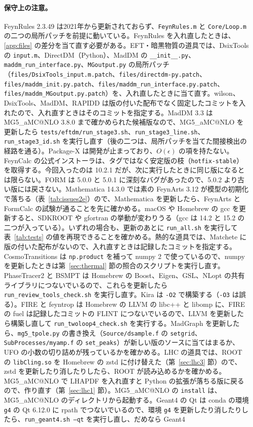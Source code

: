 \documentclass[a4paper,10pt]{ltjsarticle}
\makeatletter
\newcommand{\MGaMC}{MG5\_aMC@NLO}
\makeatother
\begin{document}
\paragraph{保守上の注意。}FeynRules 2.3.49 は2021年から更新されておらず、\texttt{FeynRules.m} と \texttt{Core/Loop.m} の二つの局所パッチを前提に動いている。FeynRules を入れ直したときは、\ref{app:files} の差分を当て直す必要がある。EFT・暗黒物質の道具では、DsixTools の \texttt{input.m}、DirectDM（Python）、MadDM の \texttt{\_\_init\_\_.py}、\texttt{maddm\_run\_interface.py}、\texttt{MGoutput.py} の局所パッチ（\nolinkurl{files/DsixTools_input.m.patch}、\nolinkurl{files/directdm-py.patch}、\nolinkurl{files/maddm_init.py.patch}、\nolinkurl{files/maddm_run_interface.py.patch}、\nolinkurl{files/maddm_MGoutput.py.patch}）を、入れ直したときに当て直す。wilson、DsixTools、MadDM、RAPIDD は版の付いた配布でなく固定したコミットを入れたので、入れ直すときはそのコミットを指定する。MadDM 3.3 は \MGaMC{} 3.8.0 まで確かめられた候補版なので、\MGaMC{} を更新したら \nolinkurl{tests/eftdm/run_stage3.sh}、\texttt{run\_stage3\_line.sh}、\texttt{run\_stage3\_id.sh} を実行し直す（後の二つは、局所パッチを当てた間接検出の経路を通る）。Package-X は開発が止まっており、$O(\epsilon)$ の項を持たない。FeynCalc の公式インストーラは、タグではなく安定版の枝（\texttt{hotfix-stable}）を取得する。今回入ったのは 10.2.1 だが、次に実行したときに同じ版になるとは限らない。FORM は 5.0.0 と 5.0.1 に深刻なバグがあったので、5.0.2 より古い版には戻さない。Mathematica 14.3.0 では素の FeynArts 3.12 が模型の初期化で落ちる（表~\ref{tab:issues2e}）ので、Mathematica を更新したら、FeynArts と FormCalc の試験が通ることを先に確かめる。macOS や Homebrew の gcc を更新すると、SDKROOT や gfortran の挙動が変わりうる（gcc は 14.2 と 15.2 の二つが入っている）。いずれの場合も、更新のあとに \texttt{run\_all.sh} を実行して表~\ref{tab:tests} の値を再現できることを確かめる。熱的な道具では、Matchete に版の付いた配布がないので、入れ直すときは記録したコミットを指定する。CosmoTransitions は \texttt{np.product} を補って numpy 2 で使っているので、numpy を更新したときは第~\ref{sec:thermal} 節の照合のスクリプトを実行し直す。PhaseTracer2 と BSMPT は Homebrew の Boost、Eigen、GSL、NLopt の共有ライブラリにつないでいるので、これらを更新したら \nolinkurl{run_review_tools_check.sh} を実行し直す。Kira は \texttt{-O2} で構築する（\texttt{-O3} は誤る）。FIRE と feyntrop は Homebrew の LLVM の libc++ と libomp に、FIRE の fuel は記録したコミットの FLINT につないでいるので、LLVM を更新したら構築し直して \nolinkurl{run_twoloop4_check.sh} を実行する。MadGraph を更新したら、\nolinkurl{mg5_tpole.py} の書き換え（\texttt{Source/dsample.f} の \texttt{setgrid}、\texttt{SubProcesses/myamp.f} の \texttt{set\_peaks}）が新しい版のソースに当てはまるか、UFO の小数の切り詰めが残っているかを確かめる。LHC の道具では、ROOT の \texttt{libCling.so} を Homebrew の zstd に付け替えた（第~\ref{sec:lhc3} 節）ので、zstd を更新したり消したりしたら、ROOT が読み込めるかを確かめる。\MGaMC{} で LHAPDF を入れ直すと Python の拡張が落ちる版に戻るので、作り直す（第~\ref{sec:lhc1} 節）。\MGaMC{} の \texttt{install} は、\MGaMC{} のディレクトリから起動する。Geant4 の Qt は conda の環境 \texttt{g4} の Qt 6.12.0 に rpath でつないでいるので、環境 \texttt{g4} を更新したり消したりしたら、\texttt{run\_geant4.sh --qt} を実行し直し、だめなら Geant4 
\end{document}
